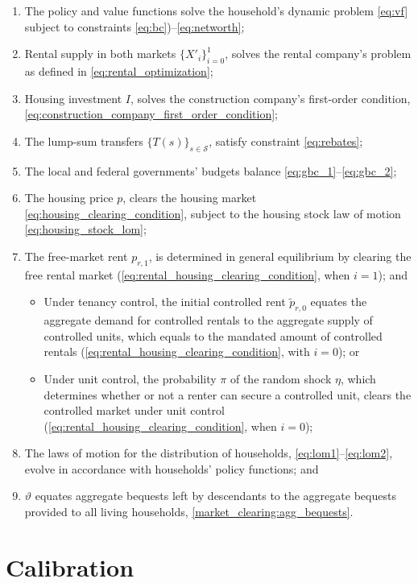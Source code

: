 \documentclass[parskip=full]{article}
\begin{document}
\begin{enumerate}
\item The policy and value functions solve the household's dynamic problem \eqref{eq:vf} subject to constraints \eqref{eq:bc})--\eqref{eq:networth};
\item Rental supply in both markets $\{X'_{i}\}^{1}_{i=0}$, solves the rental company's problem as defined in \eqref{eq:rental_optimization};
\item Housing investment $I$, solves the construction company's first-order condition, 
\eqref{eq:construction_company_first_order_condition};
\item The lump-sum transfers $\{T(s)\}_{s \in \mathcal{S}}$, satisfy constraint \eqref{eq:rebates};
\item The local and federal governments' budgets balance \eqref{eq:gbc_1}--\eqref{eq:gbc_2};
\item The housing price $p$, clears the housing market
\eqref{eq:housing_clearing_condition}, subject to the housing stock law of motion \eqref{eq:housing_stock_lom};
\item The free-market rent $p_{r,1}$, is determined in general equilibrium by clearing the free rental market (\eqref{eq:rental_housing_clearing_condition}, when $i=1$); and
\begin{itemize}
    \item Under tenancy control, the initial controlled rent $\tilde{p}_{r,0}$ equates the aggregate demand for controlled rentals to the aggregate supply of controlled units, which equals to the mandated amount of controlled rentals (\eqref{eq:rental_housing_clearing_condition}, with $i=0$); or
    \item Under unit control, the probability $\pi$ of the random shock $\eta$, which determines whether or not a renter can secure a controlled unit, clears the controlled market under unit control (\eqref{eq:rental_housing_clearing_condition}, when $i=0$);
\end{itemize}
\item The laws of motion for the distribution of households, \eqref{eq:lom1}--\eqref{eq:lom2}, evolve in accordance with households' policy functions; and
\item $\vartheta$ equates aggregate bequests left by descendants to the aggregate bequests provided to all living households, \eqref{market_clearing:agg_bequests}.
\end{enumerate}

\section{Calibration}\label{sec:calibration}
\end{document}
